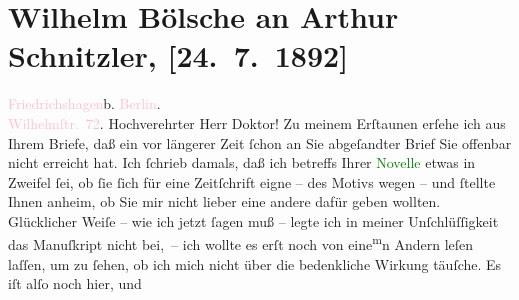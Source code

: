 

               \section[Wilhelm Bölsche an Arthur Schnitzler, {[}24. 7. 1892{]}]{ Wilhelm Bölsche an Arthur Schnitzler, {[}24. 7. 1892{]}}\nopagebreak{}\rehead{ }\normalsize\beginnumbering{} \toendnotes[C]{\smallbreak\pagebreak[2]} 
\toendnotes[C]{\smallbreak}\pstart
           \raggedleft{}{\pb}\textcolor{pink}{Friedrichshagen}{}\ledrightnote{\textcolor{pink}{Friedrichshagen}}{\\}b. \textcolor{pink}{Berlin}{}\ledrightnote{\textcolor{pink}{Berlin}}.{\\}\textcolor{pink}{Wilhelmſtr. 72}{}\ledrightnote{\textcolor{pink}{Peter-Hille-Straße}}.\pend
           \pstart\center{}Hochverehrter Herr Doktor!\pend\pstart
           Zu meinem Erſtaunen erſehe ich aus Ihrem Briefe, daß ein vor längerer Zeit ſchon
                    an Sie abgeſandter Brief Sie offenbar nicht erreicht hat. Ich ſchrieb damals,
                    daß ich betreffs Ihrer \textcolor{green}{Novelle}{} etwas \introOben{}in\introOben{} Zweifel ſei, ob ſie ſich für
                    eine Zeitſchrift eigne – des Motivs wegen – und ſtellte Ihnen anheim, ob Sie mir
                    nicht lieber eine andere dafür geben wollten. Glücklicher Weiſe – wie ich jetzt
                    ſagen muß – legte ich in {\pb}meiner Unſchlüſſigkeit
                    das Manuſkript nicht bei, – ich wollte es erſt noch von eine\substVorne{}\textsuperscript{m}\substDazwischen{}n\substHinten{} Andern leſen laſſen, um  zu ſehen, ob
                    ich mich nicht über die bedenkliche Wirkung täuſche. Es iſt alſo noch hier, und

